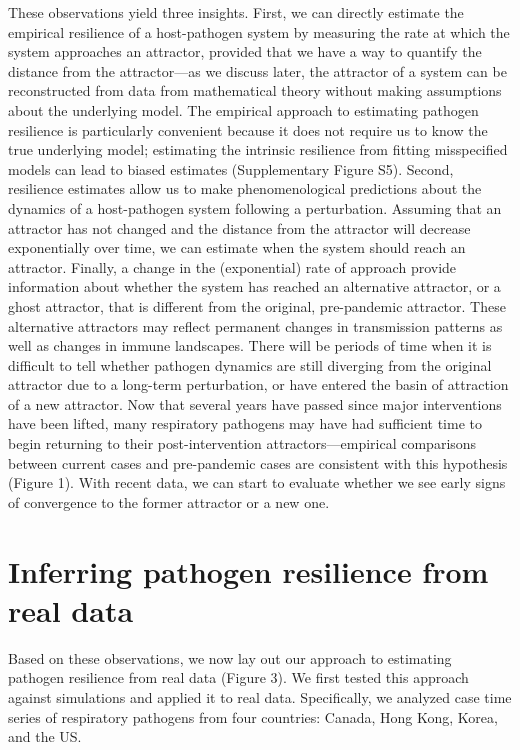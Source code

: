 \documentclass[12pt]{article}
\begin{document}
These observations yield three insights.
First, we can directly estimate the empirical resilience of a host-pathogen system by measuring the rate at which the system approaches an attractor, provided that we have a way to quantify the distance from the attractor---as we discuss later, the attractor of a system can be reconstructed from data from mathematical theory without making assumptions about the underlying model.
The empirical approach to estimating pathogen resilience is particularly convenient because it does not require us to know the true underlying model;
estimating the intrinsic resilience from fitting misspecified models can lead to biased estimates (Supplementary Figure S5).
Second, resilience estimates allow us to make phenomenological predictions about the dynamics of a host-pathogen system following a perturbation.
Assuming that an attractor has not changed and the distance from the attractor will decrease exponentially over time, we can estimate when the system should reach an attractor.
Finally, a change in the (exponential) rate of approach provide information about whether the system has reached an alternative attractor, or a ghost attractor, that is different from the original, pre-pandemic attractor.
These alternative attractors may reflect permanent changes in transmission patterns as well as changes in immune landscapes.
There will be periods of time when it is difficult to tell whether pathogen dynamics are still diverging from the original attractor due to a long-term perturbation, or have entered the basin of attraction of a new attractor. 
Now that several years have passed since major interventions have been lifted, many respiratory pathogens may have had sufficient time to begin returning to their post-intervention attractors---empirical comparisons between current cases and pre-pandemic cases are consistent with this hypothesis (Figure 1).
With recent data, we can start to evaluate whether we see early signs of convergence to the former attractor or a new one.

\section*{Inferring pathogen resilience from real data}

Based on these observations, we now lay out our approach to estimating pathogen resilience from real data (Figure 3).
We first tested this approach against simulations and applied it to real data.
Specifically, we analyzed case time series of respiratory pathogens from four countries: Canada, Hong Kong, Korea, and the US.
\end{document}
